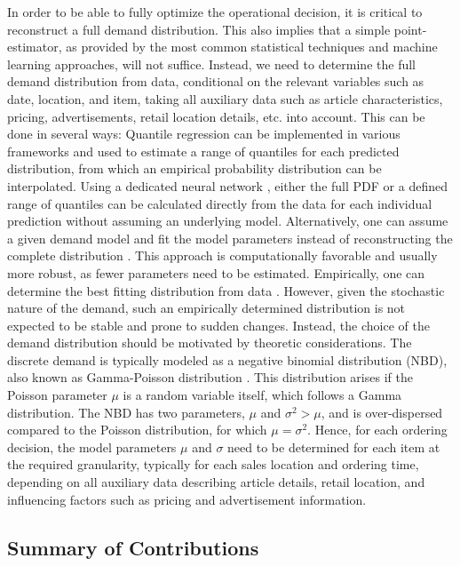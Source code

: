 \documentclass[BCOR=1mm, DIV=calc,10pt,
twoside=true,
twocolumn,
headings=normal]{scrartcl}
\begin{document}
In order to be able to fully optimize the operational decision, it is critical to reconstruct a full demand distribution. This also implies that a simple point-estimator, as provided by the most common statistical techniques and machine learning approaches, will not suffice. Instead, we need to determine the full demand distribution from data, conditional on the relevant variables such as date, location, and item, taking all auxiliary data such as article characteristics, pricing, advertisements, retail location details, etc. into account. This can be done in several ways: Quantile regression \cite{koenker2001, wen2017} can be implemented in various frameworks and used to estimate a range of quantiles for each predicted distribution, from which an empirical probability distribution can be interpolated. Using a dedicated neural network \cite{Feindt2006190}, either the full PDF or a defined range of quantiles can be calculated directly from the data for each individual prediction without assuming an underlying model. Alternatively, one can assume a given demand model and fit the model parameters instead of reconstructing the complete distribution \cite{astonpr373, SALINAS20201181}. This approach is computationally favorable and usually more robust, as fewer parameters need to be estimated. Empirically, one can determine the best fitting distribution from data \cite{adan1995}. However, given the stochastic nature of the demand, such an empirically determined distribution is not expected to be stable and prone to sudden changes. Instead, the choice of the demand distribution should be motivated by theoretic considerations. The discrete demand is typically modeled as a negative binomial distribution (NBD), also known as Gamma-Poisson distribution \cite{Ehrenberg1959,Ehrenberg1967,Ehrenberg1972,Chatfield1973,Schmittlein_1985}. This distribution arises if the Poisson parameter $\mu$ is a random variable itself, which follows a Gamma distribution. The NBD has two parameters, $\mu$ and $ \sigma^2 > \mu$, and is over-dispersed compared to the Poisson distribution, for which $\mu = \sigma^2$. Hence, for each ordering decision, the model parameters $\mu$ and $\sigma$ need to be determined for each item at the required granularity, typically for each sales location and ordering time, depending on all auxiliary data describing article details, retail location, and influencing factors such as pricing and advertisement information.

\subsection*{Summary of Contributions}
\end{document}
